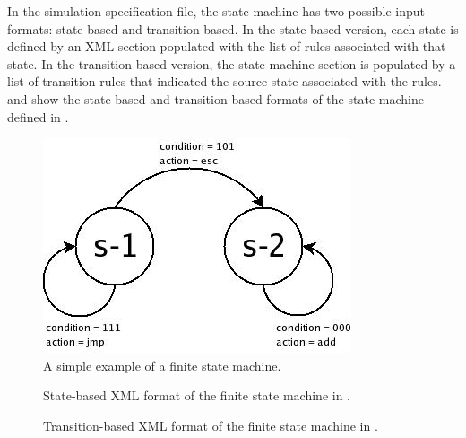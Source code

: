 In the simulation specification file, the state machine has two possible input formats: state-based and transition-based. In the state-based version, each state is defined by an XML section populated with the list of rules associated with that state.  In the transition-based version, the state machine section is populated by a list of transition rules that indicated the source state associated with the rules.   and  show the state-based and transition-based formats of the state machine defined in .

\begin{figure}[ht]
  \centering
  \includegraphics[scale=.5]{Figures/SimpleMachine.jpg}
\caption{A simple example of a finite state machine.}
\label{fig:SimpleFSA}
\end{figure}

\begin{figure}[ht]
  \singlespace
  \centering
\caption{State-based XML format of the finite state machine in .}
\label{fig:StateBasedFSA}
\end{figure}

\begin{figure}[ht]
  \singlespace{}
  \centering
\caption{Transition-based XML format of the finite state machine in .}
\label{fig:TransitionBasedFSA}
\end{figure}

